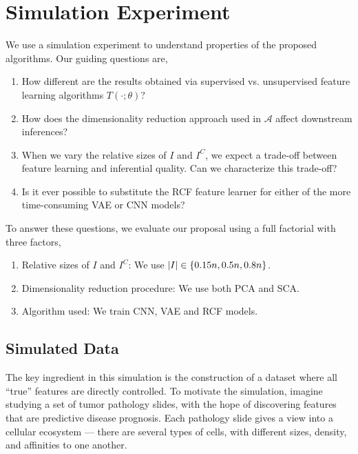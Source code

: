 
\section{Simulation Experiment}
\label{sec:simulation}

We use a simulation experiment to understand properties of the proposed
algorithms. Our guiding questions are,

\begin{enumerate}
\item How different are the results obtained via supervised vs. unsupervised
  feature learning algorithms $T\left(\cdot; \theta\right)$?
\item How does the dimensionality reduction approach used in $\mathcal{A}$
  affect downstream inferences?
\item When we vary the relative sizes of $I$ and $I^{C}$, we expect a trade-off
  between feature learning and inferential quality. Can we characterize this
  trade-off?
\item Is it ever possible to substitute the RCF feature learner for either of
  the more time-consuming VAE or CNN models?
\end{enumerate}

To answer these questions, we evaluate our proposal using a full factorial with
three factors,

\begin{enumerate}
\item Relative sizes of $I$ and $I^{C}$: We use $\left|I\right| \in \left\{0.15n,
  0.5n, 0.8n\right\}$.
\item Dimensionality reduction procedure: We use both PCA and SCA.
\item Algorithm used: We train CNN, VAE and RCF models.
\end{enumerate}

\subsection{Simulated Data}

The key ingredient in this simulation is the construction of a dataset where all
``true'' features are directly controlled. To motivate the simulation, imagine
studying a set of tumor pathology slides, with the hope of discovering features
that are predictive disease prognosis. Each pathology slide gives a view into a
cellular ecosystem — there are several types of cells, with different sizes,
density, and affinities to one another.

